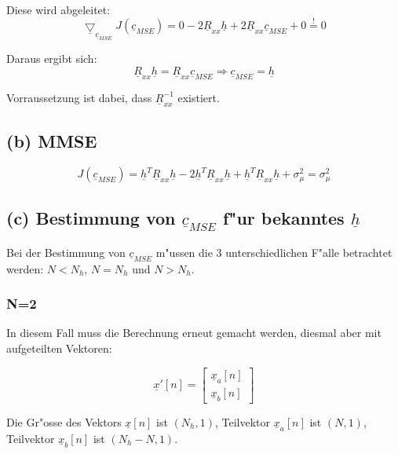 Diese wird abgeleitet:
\begin{equation}
 \underline{\bigtriangledown}_{\underline{c}_{MSE}} J(\underline{c}_{MSE}) = 0 - 2 \underline{R}_{xx} \underline{h} + 2 \underline{R}_{xx} \underline{c}_{MSE} + 0 \stackrel{!}{=} 0
\end{equation}

Daraus ergibt sich:
\begin{equation}
 \underline{R}_{xx} \underline{h} = \underline{R}_{xx} \underline{c}_{MSE} \Rightarrow \underline{c}_{MSE} = \underline{h}
\end{equation}

Vorraussetzung ist dabei, dass $\underline{R}_{xx}^{-1}$ existiert.

\subsection{(b) MMSE}

\begin{equation}
 J(\underline{c}_{MSE}) = \underline{h}^T \underline{R}_{xx} \underline{h} - 2 \underline{h}^T \underline{R}_{xx} \underline{h} + \underline{h}^T \underline{R}_{xx} \underline{h} + \sigma_\mu^2 = \sigma_\mu^2
\end{equation}


\subsection{(c) Bestimmung von $\underline{c}_{MSE}$ f"ur bekanntes $\underline{h}$}

Bei der Bestimmung von $\underline{c}_{MSE}$ m"ussen die 3 unterschiedlichen F"alle betrachtet werden: $N<N_h$, $N=N_h$ und $N>N_h$.


\subsubsection{N=2}

In diesem Fall muss die Berechnung erneut gemacht werden, diesmal aber mit aufgeteilten Vektoren:

$$ \underline{x}'[n] = \begin{bmatrix} \underline{x}_a[n] \\ \underline{x}_b[n] \end{bmatrix} $$

Die Gr"osse des Vektors $\underline{x}[n]$ ist $(N_h,1)$, Teilvektor $\underline{x}_a[n]$ ist $(N,1)$, Teilvektor $\underline{x}_b[n]$ ist $(N_h-N,1)$.


